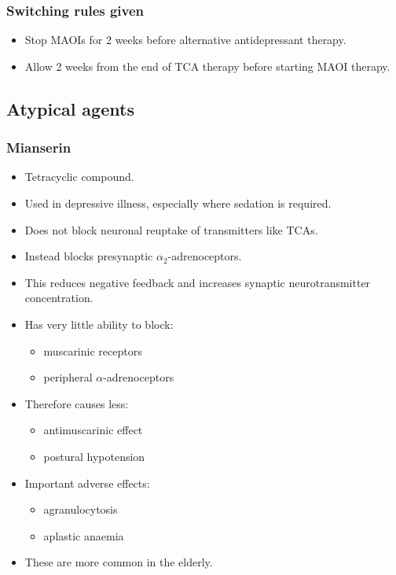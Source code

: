 \documentclass[11pt,a4paper]{article}
\begin{document}
\subsubsection{Switching rules given}
\begin{itemize}
  \item Stop MAOIs for 2 weeks before alternative antidepressant therapy.
  \item Allow 2 weeks from the end of TCA therapy before starting MAOI therapy.
\end{itemize}

\subsection{Atypical agents}

\subsubsection{Mianserin}
\begin{itemize}
  \item Tetracyclic compound.
  \item Used in depressive illness, especially where sedation is required.
  \item Does not block neuronal reuptake of transmitters like TCAs.
  \item Instead blocks presynaptic $\alpha_2$-adrenoceptors.
  \item This reduces negative feedback and increases synaptic neurotransmitter concentration.
  \item Has very little ability to block:
  \begin{itemize}
    \item muscarinic receptors
    \item peripheral $\alpha$-adrenoceptors
  \end{itemize}
  \item Therefore causes less:
  \begin{itemize}
    \item antimuscarinic effect
    \item postural hypotension
  \end{itemize}
  \item Important adverse effects:
  \begin{itemize}
    \item agranulocytosis
    \item aplastic anaemia
  \end{itemize}
  \item These are more common in the elderly.
\end{itemize}
\end{document}

